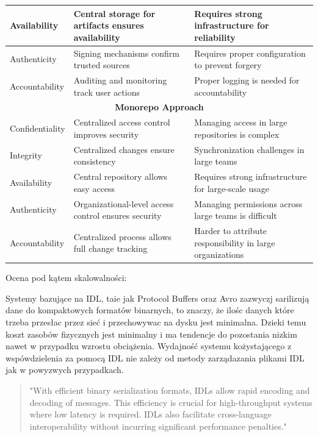\documentclass[runningheads,12pt]{llncs}
\begin{document}
\begin{longtable}{|p{4cm}|p{4cm}|p{4cm}|}
Availability & Central storage for artifacts ensures availability & Requires strong infrastructure for reliability \\ \hline
Authenticity & Signing mechanisms confirm trusted sources & Requires proper configuration to prevent forgery \\ \hline
Accountability & Auditing and monitoring track user actions & Proper logging is needed for accountability \\ \hline
\multicolumn{3}{|c|}{\textbf{Monorepo Approach}} \\ \hline
Confidentiality & Centralized access control improves security & Managing access in large repositories is complex \\ \hline
Integrity & Centralized changes ensure consistency & Synchronization challenges in large teams \\ \hline
Availability & Central repository allows easy access & Requires strong infrastructure for large-scale usage \\ \hline
Authenticity & Organizational-level access control ensures security & Managing permissions across large teams is difficult \\ \hline
Accountability & Centralized process allows full change tracking & Harder to attribute responsibility in large organizations \\ \hline

\end{longtable}

Ocena pod kątem skalowalności:

Systemy bazujące na IDL, taie jak Protocol Buffers oraz Avro zazwyczj sarilizują dane do kompaktowych formatów binarnych, to znaczy, że ilośc danych które trzeba przesłac przez sieć i przechowywac na dysku jest minimalna. Dzieki temu koszt zasobów fizycznych jest minimalny i ma tendencje do pozostania nizkim nawet w przypadku wzrostu obciążenia. Wydajność systemu kożystającego z wspówdzielenia za pomocą IDL nie zależy od metody zarządazania plikami IDL jak w powyzwych przypadkach.

\begin{quote}
    "With efficient binary serialization formats, IDLs allow rapid encoding and decoding of messages. This efficiency is crucial for high-throughput systems where low latency is required. IDLs also facilitate cross-language interoperability without incurring significant performance penalties." ~\cite[p. 123]{kleppmann2017designing}
\end{quote}
\end{document}
